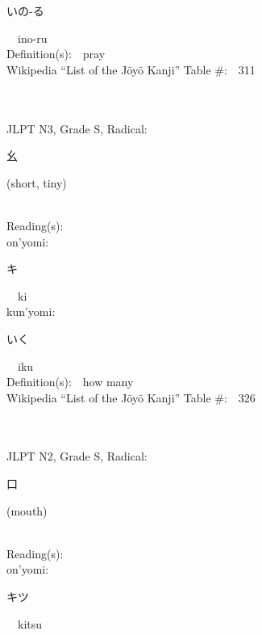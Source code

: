 \begin{multicols}{2}
{\hspace*{2em}}{\begin{CJK}{UTF8}{min} いの-る \end{CJK}}\ \ ino-ru\ \ \\
Definition(s):\ \ pray \\
Wikipedia ``List of the J\=oy\=o Kanji'' Table \#:\ \ 311 \\
\ \ \\
{\fontsize{34pt}{40pt}  }\ \ \\  %
{JLPT N3, Grade S, Radical:\ \ {\begin{CJK}{UTF8}{min} 幺 \end{CJK}} (short, tiny) } \\
Reading(s):\ \ \\
{\hspace*{1em}}on'yomi:\ \ \\
{\hspace*{2em}}{\begin{CJK}{UTF8}{min} キ \end{CJK}}\ \ ki\ \ \\
{\hspace*{1em}}kun'yomi:\ \ \\
{\hspace*{2em}}{\begin{CJK}{UTF8}{min} いく \end{CJK}}\ \ iku\ \ \\
Definition(s):\ \ how many \\
Wikipedia ``List of the J\=oy\=o Kanji'' Table \#:\ \ 326 \\
\ \ \\
{\fontsize{34pt}{40pt}  }\ \ \\  %
{JLPT N2, Grade S, Radical:\ \ {\begin{CJK}{UTF8}{min} 口 \end{CJK}} (mouth) } \\
Reading(s):\ \ \\
{\hspace*{1em}}on'yomi:\ \ \\
{\hspace*{2em}}{\begin{CJK}{UTF8}{min} キツ \end{CJK}}\ \ kitsu\ \ \\

\end{multicols}
